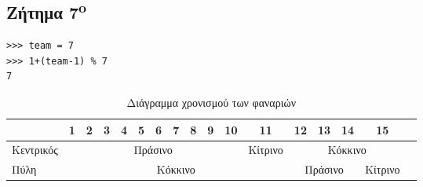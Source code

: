 \documentclass[a4paper,10pt]{article} \usepackage{anysize}
\begin{document}


\begin{minipage}{0.4\textwidth}
\begin{flushleft}
\section*{Ζήτημα 7\textsuperscript{o}}
\end{flushleft}
\end{minipage}
\begin{minipage}{0.3\textwidth}
\begin{flushright}
\begin{verbatim}
>>> team = 7
>>> 1+(team-1) % 7
7
\end{verbatim}
\end{flushright}
\end{minipage}

\begin{table}[h]
	\begin{tabular}{|l|c|c|c|c|c|c|c|c|c|c|c|c|c|c|c|c|}
	\hline
	& 1 & 2 & 3 & 4 & 5 & 6 & 7 & 8 & 9 & 10 & 11 & 12 & 13 & 14 & 15\\
	\hline
	Κεντρικός & \multicolumn{10}{c|}{\cellcolor{green}Πράσινο} &
	\cellcolor{yellow}Κίτρινο & \multicolumn{4}{c|}{\cellcolor{red}Κόκκινο}\\
	\hline
	Πύλη & \multicolumn{11}{c}{\cellcolor{red}Κόκκινο} &
	\multicolumn{3}{c|}{\cellcolor{green}Πράσινο} & \cellcolor{yellow}Κίτρινο\\
	\hline
	\end{tabular}
	\caption{Διάγραμμα χρονισμού των φαναριών}
\end{table}

\inputminted[linenos,obeytabs,frame=leftline,fontsize=\footnotesize]{oldasm}{files/fanaria.8085}
\section*{} 
\end{document}
